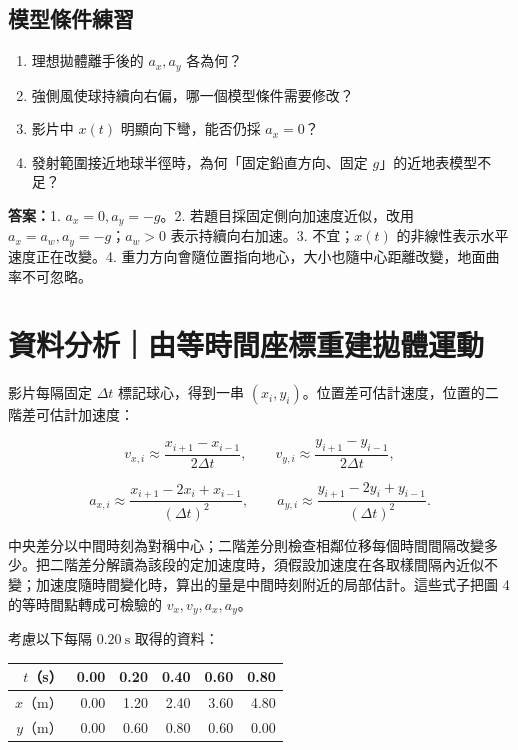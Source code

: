 \documentclass[11pt,a4paper]{article}
\newcounter{none}
\providecommand{\tightlist}{%
  \setlength{\itemsep}{0pt}\setlength{\parskip}{0pt}}
\begin{document}
\begin{HandoutSelfCheck}

\subsection{模型條件練習}\label{ux6a21ux578bux689dux4ef6ux7df4ux7fd2}

\begin{enumerate}
\def\labelenumi{\arabic{enumi}.}
\tightlist
\item
  理想拋體離手後的 \(a_x,a_y\) 各為何？
\item
  強側風使球持續向右偏，哪一個模型條件需要修改？
\item
  影片中 \(x(t)\) 明顯向下彎，能否仍採 \(a_x=0\)？
\item
  發射範圍接近地球半徑時，為何「固定鉛直方向、固定 \(g\)」的近地表模型不足？
\end{enumerate}

\textbf{答案：}1. \(a_x=0,a_y=-g\)。2. 若題目採固定側向加速度近似，改用 \(a_x=a_w,a_y=-g\)；\(a_w>0\) 表示持續向右加速。3. 不宜；\(x(t)\) 的非線性表示水平速度正在改變。4. 重力方向會隨位置指向地心，大小也隨中心距離改變，地面曲率不可忽略。

\end{HandoutSelfCheck}

\section{資料分析｜由等時間座標重建拋體運動}\label{ux8cc7ux6599ux5206ux6790ux7531ux7b49ux6642ux9593ux5ea7ux6a19ux91cdux5efaux62cbux9ad4ux904bux52d5}

影片每隔固定 \(\Delta t\) 標記球心，得到一串 \((x_i,y_i)\)。位置差可估計速度，位置的二階差可估計加速度：

\[
v_{x,i}\approx\frac{x_{i+1}-x_{i-1}}{2\Delta t},\qquad
v_{y,i}\approx\frac{y_{i+1}-y_{i-1}}{2\Delta t},
\]

\[
a_{x,i}\approx\frac{x_{i+1}-2x_i+x_{i-1}}{(\Delta t)^2},\qquad
a_{y,i}\approx\frac{y_{i+1}-2y_i+y_{i-1}}{(\Delta t)^2}.
\]

中央差分以中間時刻為對稱中心；二階差分則檢查相鄰位移每個時間間隔改變多少。把二階差分解讀為該段的定加速度時，須假設加速度在各取樣間隔內近似不變；加速度隨時間變化時，算出的量是中間時刻附近的局部估計。這些式子把圖 4 的等時間點轉成可檢驗的 \(v_x,v_y,a_x,a_y\)。

考慮以下每隔 \(0.20\ \mathrm s\) 取得的資料：

{\def\LTcaptype{none} %
\begin{longtable}[]{@{}rrrrrr@{}}
\toprule\noalign{}
\(t\)（s） & 0.00 & 0.20 & 0.40 & 0.60 & 0.80 \\
\midrule\noalign{}
\endhead
\bottomrule\noalign{}
\endlastfoot
\(x\)（m） & 0.00 & 1.20 & 2.40 & 3.60 & 4.80 \\
\(y\)（m） & 0.00 & 0.60 & 0.80 & 0.60 & 0.00 \\
\end{longtable}
}
\end{document}
